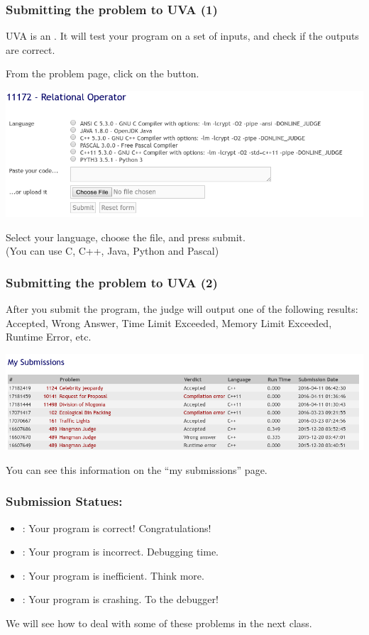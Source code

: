 \documentclass{beamer}
\begin{document}
\begin{frame}
  \frametitle{Submitting the problem to UVA (1)}

  {\small
  UVA is an . It will test your
  program on a set of inputs, and check if the outputs are correct.

  From the problem page, click on the  button. 
  
  \begin{center}
    \includegraphics[width=.8\textwidth]{../img/submitpage}
  \end{center}
  
  Select your language, choose the file, and press submit.\\
  (You can use C, C++, Java, Python {\tiny and Pascal})}
\end{frame}

\begin{frame}
  \frametitle{Submitting the problem to UVA (2)}

  {\small
    After you submit the program, the judge will output one of the
    following results: Accepted, Wrong Answer, Time Limit Exceeded,
    Memory Limit Exceeded, Runtime Error, etc.
    
    \begin{center}
      \includegraphics[width=.8\textwidth]{../img/submissionpage}
    \end{center}

    You can see this information on the ``my submissions'' page.
  }
\end{frame}

\begin{frame}
  \frametitle{Submission Statues:}
  \begin{itemize}
  \item {}: Your program is correct!
    Congratulations!
  \item {}: Your program is incorrect. Debugging
    time.
  \item {}: Your program is
    inefficient. Think more.
  \item {}: Your program is crashing. To the
    debugger!
  \end{itemize}

  \bigskip

  We will see how to deal with some of these problems in the next class.
\end{frame}
\end{document}
